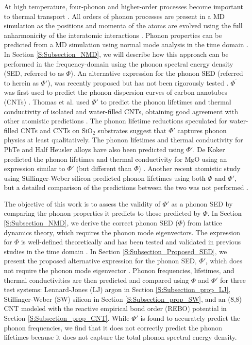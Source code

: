 \documentclass[12pt,twocolumn,iop]{/usr/share/texmf-texlive/tex/latex/iop/iopart}[/usr/share/texmf-texlive/tex/latex/iop/]
\begin{document}
At high temperature, four-phonon and higher-order processes become important to thermal transport \cite{wallace1972,srivastava1990,turney2009a,esfarjani2011}. All orders of phonon processes are present in a MD simulation as the positions and momenta of the atoms are evolved using the full anharmonicity of the interatomic interactions \cite{mcgaughey2004c,esfarjani2011}. Phonon properties can be predicted from a MD simulation using normal mode analysis in the time domain \cite{ladd1986,mcgaughey2004c,henry2008,turney2009a,goicochea2010,He2011}. In Section \ref{S:Subsection_NMD}, we will describe how this approach can be performed in the frequency-domain using the phonon spectral energy density (SED, referred to as $\Phi$). An alternative expression for the phonon SED (referred to herein as $\Phi'$), was recently proposed but has not been rigorously tested \cite{maruyama2003,shiomi2006,thomas2010c}. $\Phi^{'}$ was first used to predict the phonon dispersion curves of carbon nanotubes (CNTs) \cite{maruyama2003}. Thomas et al. used $\Phi'$ to predict the phonon lifetimes and thermal conductivity of isolated and water-filled CNTs, obtaining good agreement with other atomistic predictions \cite{thomas2010c}. The phonon lifetime reductions speculated for water-filled CNTs\cite{thomas2010c} and CNTs on SiO$_2$ substrates\cite{shiomi2011b} suggest that $\Phi'$ captures phonon physics at least qualitatively. The phonon lifetimes and thermal conductivity for PbTe\cite{qiu2011} and Half Heusler alloys\cite{shiomi2011a} have also been predicted using $\Phi'$. De Koker predicted the phonon lifetimes and thermal conductivity for MgO using an expression similar to $\Phi'$ (but different than $\Phi$) \cite{dekoker2009}. Another recent atomistic study using Stillinger-Weber silicon predicted phonon lifetimes using both $\Phi$ and $\Phi'$, but a detailed comparison of the predictions between the two was not performed \cite{Hori2012}.

The objective of this work is to assess the validity of $\Phi'$ as a phonon SED by comparing the phonon properties it predicts to those predicted by $\Phi$. In Section \ref{S:Subsection_NMD}, we derive the correct phonon SED ($\Phi$) from lattice dynamics theory, which requires the phonon mode eigenvectors. The expression for $\Phi$ is well-defined theoretically and has been tested and validated in previous studies in the time domain \cite{ladd1986,turney2009a}. In Section \ref{S:Subsection_Proposed_SED}, we present the proposed alternative expression for the phonon SED, $\Phi'$, which does not require the phonon mode eigenvector \cite{thomas2010c}. Phonon frequencies, lifetimes, and thermal conductivities are then predicted and compared using $\Phi$ and $\Phi'$ for three test systems: Lennard-Jones (LJ) argon\cite{ashcroft1976} in Section \ref{S:Subsection_prop_LJ}, Stillinger-Weber (SW) silicon\cite{stillinger1985} in Section \ref{S:Subsection_prop_SW}, and an (8,8) CNT modeled with the reactive empirical bond order (REBO) potential\cite{brenner2002} in Section \ref{S:Subsection_prop_CNT}. While $\Phi'$ is found to accurately predict the phonon frequencies, we find that it does not correctly predict the phonon lifetimes because it does not capture the total phonon spectral energy density.
\end{document}
